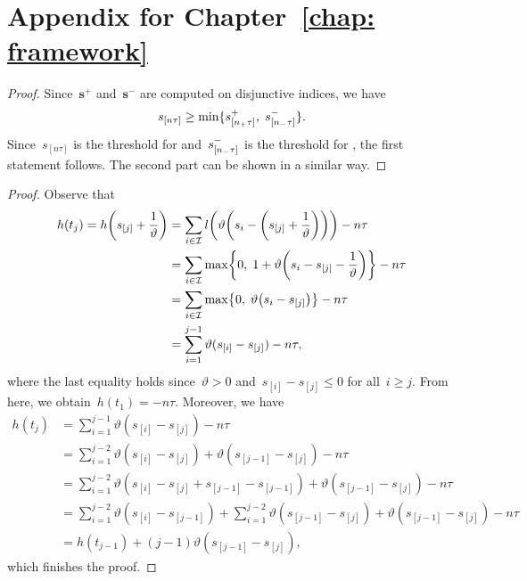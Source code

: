\chapter{Appendix for Chapter~\ref{chap: framework}}

\lemmattcomparison*
\begin{proof}
  Since~$\bm{s}^+$ and~$\bm{s}^-$ are computed on disjunctive indices, we have
  \begin{equation*}
    s_{[n\tau]} \geq \min\{s_{[n_{+}\tau]}^+, \; s_{[n_{-}\tau]}^-\}.
  \end{equation*}
  Since~$s_{[n\tau]}$ is the threshold for \Grill and~$s_{[n_{-}\tau]}^-$ is the threshold for \GrillNP, the first statement follows. The second part can be shown in a similar way.
\end{proof}

\lemmapatmatalg*
\begin{proof}
  Observe that
  \begin{align*}
    h(t_{j})
      = h\Brac{s_{[j]}+\frac{1}{\vartheta}}
      & = \sum_{i \in \I} l\Brac{\vartheta\Brac{s_i - \Brac{s_{[j]} + \frac{1}{\vartheta}}}} - n\tau \\
      & = \sum_{i \in \I} \max\Brac[c]{0,\; 1 + \vartheta\Brac{s_i - s_{[j]} - \frac{1}{\vartheta}}} - n\tau \\
      & = \sum_{i \in \I} \max\Brac[c]{0,\; \vartheta \Brac{s_i - s_{[j]}}} - n\tau \\
      & = \sum_{i = 1}^{j - 1} \vartheta(s_{[i]} - s_{[j]}) - n\tau,
  \end{align*}
  where the last equality holds since~$\vartheta > 0$ and~$s_{[i]} - s_{[j]} \leq 0$ for all~$i \geq j.$ From here, we obtain~$h(t_{1}) = -n\tau$. Moreover, we have
  \begin{align*}
    h(t_{j})
    & = \sum_{i = 1}^{j - 1} \vartheta(s_{[i]} - s_{[j]}) - n\tau \\
    & = \sum_{i = 1}^{j - 2} \vartheta(s_{[i]} - s_{[j]}) + \vartheta(s_{[j-1]} - s_{[j]}) - n\tau \\
    & = \sum_{i = 1}^{j - 2} \vartheta(s_{[i]} - s_{[j]} + s_{[j - 1]} - s_{[j - 1]}) + \vartheta(s_{[j-1]} - s_{[j]}) - n\tau \\
    & = \sum_{i = 1}^{j - 2} \vartheta(s_{[i]} - s_{[j - 1]}) + \sum_{i = 1}^{j - 2} \vartheta(s_{[j - 1]} - s_{[j]}) + \vartheta(s_{[j - 1]} - s_{[j]}) - n\tau \\
    & = h(t_{j - 1}) + (j - 1) \vartheta(s_{[j - 1]} - s_{[j]}),
  \end{align*}
  which finishes the proof.
\end{proof}
